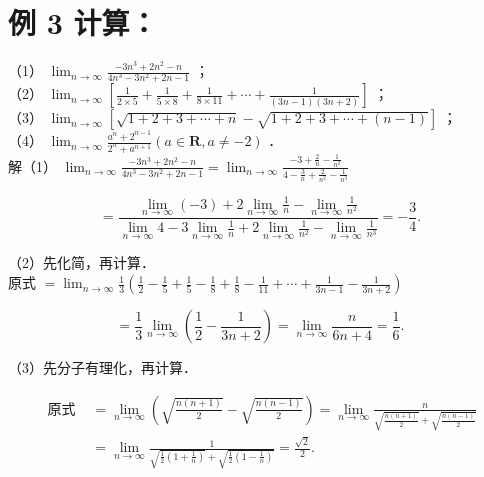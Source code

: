 \documentclass[10pt]{article}
\begin{document}
\section*{例 3 计算：}
（1） \(\lim _{n \rightarrow \infty} \frac{-3 n^{3}+2 n^{2}-n}{4 n^{3}-3 n^{2}+2 n-1}\) ；\\
（2） \(\lim _{n \rightarrow \infty}\left[\frac{1}{2 \times 5}+\frac{1}{5 \times 8}+\frac{1}{8 \times 11}+\cdots+\frac{1}{(3 n-1)(3 n+2)}\right]\) ；\\
（3） \(\lim _{n \rightarrow \infty}[\sqrt{1+2+3+\cdots+n}-\sqrt{1+2+3+\cdots+(n-1)}]\) ；\\
（4） \(\lim _{n \rightarrow \infty} \frac{a^{n}+2^{n-1}}{2^{n}+a^{n+1}}(a \in \mathbf{R}, a \neq-2)\) ．\\
解（1） \(\lim _{n \rightarrow \infty} \frac{-3 n^{3}+2 n^{2}-n}{4 n^{3}-3 n^{2}+2 n-1}=\lim _{n \rightarrow \infty} \frac{-3+\frac{2}{n}-\frac{1}{n^{2}}}{4-\frac{3}{n}+\frac{2}{n^{2}}-\frac{1}{n^{3}}}\)

\[
=\frac{\lim _{n \rightarrow \infty}(-3)+2 \lim _{n \rightarrow \infty} \frac{1}{n}-\lim _{n \rightarrow \infty} \frac{1}{n^{2}}}{\lim _{n \rightarrow \infty} 4-3 \lim _{n \rightarrow \infty} \frac{1}{n}+2 \lim _{n \rightarrow \infty} \frac{1}{n^{2}}-\lim _{n \rightarrow \infty} \frac{1}{n^{3}}}=-\frac{3}{4} .
\]

（2）先化简，再计算．\\
原式 \(=\lim _{n \rightarrow \infty} \frac{1}{3}\left(\frac{1}{2}-\frac{1}{5}+\frac{1}{5}-\frac{1}{8}+\frac{1}{8}-\frac{1}{11}+\cdots+\frac{1}{3 n-1}-\frac{1}{3 n+2}\right)\)

\[
=\frac{1}{3} \lim _{n \rightarrow \infty}\left(\frac{1}{2}-\frac{1}{3 n+2}\right)=\lim _{n \rightarrow \infty} \frac{n}{6 n+4}=\frac{1}{6} .
\]

（3）先分子有理化，再计算．

\[
\begin{aligned}
\text { 原式 } & =\lim _{n \rightarrow \infty}\left(\sqrt{\frac{n(n+1)}{2}}-\sqrt{\frac{n(n-1)}{2}}\right)=\lim _{n \rightarrow \infty} \frac{n}{\sqrt{\frac{n(n+1)}{2}}+\sqrt{\frac{n(n-1)}{2}}} \\
& =\lim _{n \rightarrow \infty} \frac{1}{\sqrt{\frac{1}{2}\left(1+\frac{1}{n}\right)}+\sqrt{\frac{1}{2}\left(1-\frac{1}{n}\right)}}=\frac{\sqrt{2}}{2} .
\end{aligned}
\]
\end{document}
